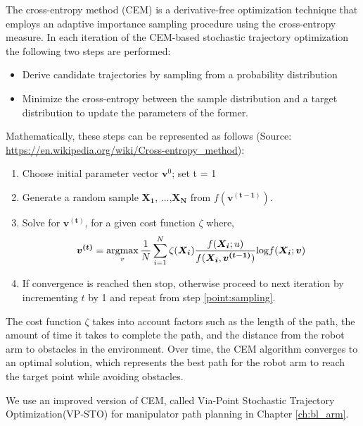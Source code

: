 The cross-entropy method (CEM)\cite{CEM_og} is a derivative-free optimization technique that employs an adaptive importance sampling procedure using the cross-entropy measure. In each iteration of the CEM-based stochastic trajectory optimization the following two steps are performed:

\begin{itemize}
    \item Derive candidate trajectories by sampling from a probability distribution
    \item Minimize the cross-entropy between the sample distribution and a target distribution to update the parameters of the former.
\end{itemize}

Mathematically, these steps can be represented as follows (Source: \url{https://en.wikipedia.org/wiki/Cross-entropy_method}):

\begin{enumerate}
    \item Choose initial parameter vector $\boldsymbol{v}^{0}$; set t = 1
    \item \label{point:sampling}Generate a random sample $\boldsymbol{X_1}$, ...,$\boldsymbol{X_N}$ from $f(\boldsymbol{v^{(t-1)}})$.
    \item Solve for $\boldsymbol{v^{(t)}}$, for a given cost function $\zeta$ where,
    \begin{equation}
        \boldsymbol{v^{(t)}} = \operatorname*{argmax}_v\frac{1}{N}\sum_{i=1}^{N}\zeta(\boldsymbol{X_i})\frac{f(\boldsymbol{X_i};u)}{f(\boldsymbol{X_i},\boldsymbol{v^{(t-1)}})}\text{log}f(\boldsymbol{X_i};\boldsymbol{v})
    \end{equation}
    \item If convergence is reached then stop, otherwise proceed to next iteration by incrementing $t$ by 1 and repeat from step \ref{point:sampling}.
\end{enumerate}

The cost function $\zeta$ takes into account factors such as the length of the path, the amount of time it takes to complete the path, and the distance from the robot arm to obstacles in the environment. Over time, the CEM algorithm converges to an optimal solution, which represents the best path for the robot arm to reach the target point while avoiding obstacles. 

We use an improved version of CEM, called Via-Point Stochastic Trajectory Optimization(VP-STO)\cite{VPSTO} for manipulator path planning in Chapter \ref{ch:bl_arm}.